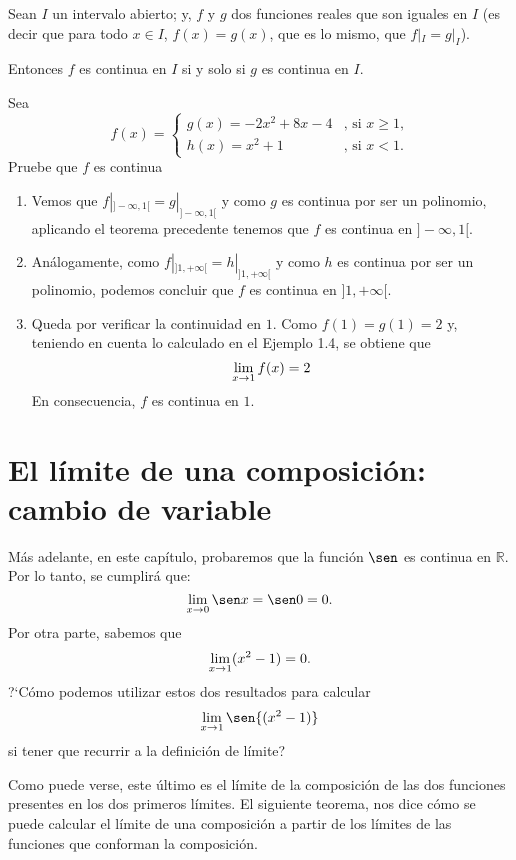 \begin{teocal}
Sean $I$ un intervalo abierto; y, $f$ y $g$ dos funciones reales que son iguales en $I$ (es decir que para todo $x\in I$, $f(x)=g(x)$, que es lo mismo, que $f|_{I}=g|_{I}$).

Entonces $f$ es continua en $I$ si y solo si $g$ es continua en $I$.
\end{teocal}%

\begin{exemplo}[Solución]{%
Sea
\[
f(x) = \begin{cases}
g(x) = -2x^2+8x-4 & \text{, si $x\geq 1$,}\\
h(x) = x^2 + 1 & \text{, si $x<1$.}
\end{cases}
\]
Pruebe que $f$ es continua
}%
\begin{enumerate}
\item[a)] Vemos que $f|_{]-\infty, 1[}=g|_{]-\infty, 1[}$ y como $g$ es continua por ser un polinomio, aplicando el teorema precedente tenemos que $f$ es continua en $]-\infty, 1[$.
\item[b)] Análogamente, como $f|_{]1, +\infty[}=h|_{]1, +\infty[}$ y como $h$ es continua por ser un polinomio, podemos concluir que $f$ es continua en $]1, +\infty[$.
\item[c)] Queda por verificar la continuidad en $1$. Como $f(1)=g(1)=2$ y, teniendo en cuenta lo calculado en el Ejemplo 1.4, se obtiene que
\[
\limjc{f(x)}{x}{1}=2
\]
En consecuencia, $f$ es continua en $1$.
\end{enumerate}
\end{exemplo}


\section{El límite de una composición: cambio de variable}
Más adelante, en este capítulo, probaremos que la función $\sen$ es continua en $\mathbb{R}$. Por
lo tanto, se cumplirá que:
\[
\limjc{\sen x}{x}{0} = \sen 0 = 0.
\]
Por otra parte, sabemos que
\[
\limjc{(x^2 - 1)}{x}{1} = 0.
\]
?`Cómo podemos utilizar estos dos resultados para calcular
\[
\limjc{\sen{(x^2 - 1)}}{x}{1}
\]
si tener que recurrir a la definición de límite?

Como puede verse, este último es el límite de la composición de las dos funciones presentes en los
dos primeros límites. El siguiente teorema, nos dice cómo se puede calcular el límite de una
composición a partir de los límites de las funciones que conforman la composición.

